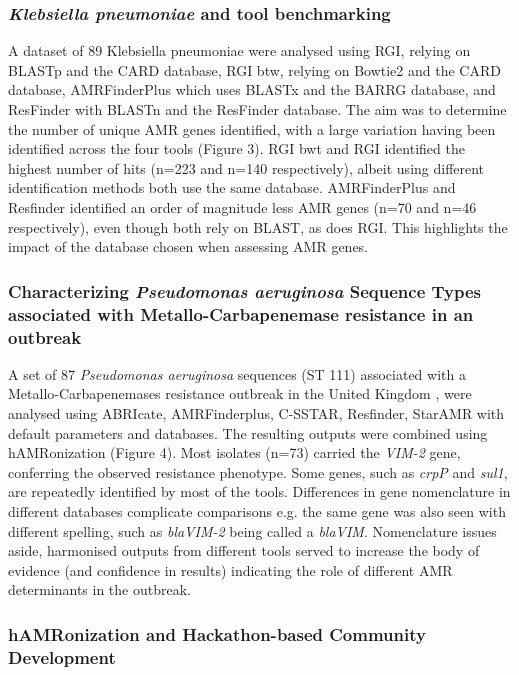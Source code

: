\subsubsection{\textit{Klebsiella pneumoniae} and tool benchmarking}

A dataset of 89 Klebsiella pneumoniae were analysed using RGI, relying on BLASTp and the CARD database, RGI btw, relying on Bowtie2 and the CARD database, AMRFinderPlus which uses BLASTx and the BARRG database, and ResFinder with BLASTn and the ResFinder database. The aim was to determine the number of unique AMR genes identified, with a large variation having been identified across the four tools (Figure 3). RGI bwt and RGI identified the highest number of hits (n=223 and n=140 respectively), albeit using different identification methods both use the same database. AMRFinderPlus and Resfinder identified an order of magnitude less AMR genes (n=70 and n=46 respectively), even though both rely on BLAST, as does RGI. This highlights the impact of the database chosen when assessing AMR genes. 

\subsubsection{Characterizing \textit{Pseudomonas aeruginosa} Sequence Types associated with Metallo-Carbapenemase resistance in an outbreak}

A set of 87 \textit{Pseudomonas aeruginosa} sequences (ST 111) associated with a Metallo-Carbapenemases resistance outbreak in the United Kingdom \cite{witney_genome_2014}, were analysed using ABRIcate, AMRFinderplus, C-SSTAR, Resfinder, StarAMR with default parameters and databases. The resulting outputs were combined using hAMRonization (Figure 4). Most isolates (n=73) carried the \textit{VIM-2} gene, conferring the observed resistance phenotype. Some genes, such as \textit{crpP} and \textit{sul1},  are repeatedly identified by most of the tools. Differences in gene nomenclature in different databases complicate comparisons e.g. the same gene was also seen with different spelling, such as \textit{blaVIM-2} being called a \textit{blaVIM}. Nomenclature issues aside, harmonised outputs from different tools served to increase the body of evidence (and confidence in results) indicating the role of different AMR determinants in the outbreak.

\subsubsection{hAMRonization and Hackathon-based Community Development}

